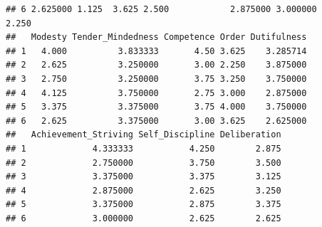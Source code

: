 \documentclass{article}\usepackage[]{graphicx}\usepackage[]{color}
\makeatletter
\newenvironment{kframe}{%
 \def\at@end@of@kframe{}%
 \ifinner\ifhmode%
  \def\at@end@of@kframe{\end{minipage}}%
  \begin{minipage}{\columnwidth}%
 \fi\fi%
 \def\FrameCommand##1{\hskip\@totalleftmargin \hskip-\fboxsep
 \colorbox{shadecolor}{##1}\hskip-\fboxsep
     \hskip-\linewidth \hskip-\@totalleftmargin \hskip\columnwidth}%
 \MakeFramed {\advance\hsize-\width
   \@totalleftmargin\z@ \linewidth\hsize
   \@setminipage}}%
 {\par\unskip\endMakeFramed%
 \at@end@of@kframe}
\newenvironment{knitrout}{}{} %
\makeatother
\begin{document}
\begin{knitrout}
\begin{kframe}
\begin{verbatim}
## 6 2.625000 1.125  3.625 2.500            2.875000 3.000000      2.250
##   Modesty Tender_Mindedness Competence Order Dutifulness
## 1   4.000          3.833333       4.50 3.625    3.285714
## 2   2.625          3.250000       3.00 2.250    3.875000
## 3   2.750          3.250000       3.75 3.250    3.750000
## 4   4.125          3.750000       2.75 3.000    2.875000
## 5   3.375          3.375000       3.75 4.000    3.750000
## 6   2.625          3.375000       3.00 3.625    2.625000
##   Achievement_Striving Self_Discipline Deliberation
## 1             4.333333           4.250        2.875
## 2             2.750000           3.750        3.500
## 3             3.375000           3.375        3.125
## 4             2.875000           2.625        3.250
## 5             3.375000           2.875        3.375
## 6             3.000000           2.625        2.625
\end{verbatim}
\end{kframe}
\end{knitrout}
\end{document}
